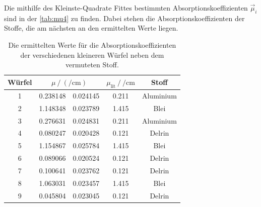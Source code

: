  \noindent Die mithilfe des Kleinste-Quadrate Fittes bestimmten Absorptionskoeffizienten $\vec{\mu}_i$ sind in der \autoref{tab:mu4} zu finden. 
  Dabei stehen die Absorptionskoeffizienten der Stoffe, die am nächsten an den ermittelten Werte liegen. 

  \begin{table}[H]
    \centering
    \caption{Die ermittelten Werte für die Absorptionskoeffizienten der verschiedenen kleineren Würfel neben dem vermuteten Stoff.}
    \label{tab:mu4}
    \begin{tabular}{c S[table-format=1.6] @{${}\pm{}$} S[table-format=1.6] S[table-format=1.6] c}
      \toprule
      {Würfel} &  & {$\mu_{\text{lit}} \mathbin{/} \si{\per\centi\metre}$} & {Stoff} \\
       & 0.238148 & 0.024145 & 0.211 & Aluminium \\
      2 & 1.148348 & 0.023789 & 1.415 & Blei \\
      3 & 0.276631 & 0.024831 & 0.211 & Aluminium \\
      4 & 0.080247 & 0.020428 & 0.121 & Delrin \\
      5 & 1.154867 & 0.025784 & 1.415 & Blei \\
      6 & 0.089066 & 0.020524 & 0.121 & Delrin \\
      7 & 0.100641 & 0.023762 & 0.121 & Delrin \\
      8 & 1.063031 & 0.023457 & 1.415 & Blei \\
      9 & 0.045804 & 0.023045 & 0.121 & Delrin \\
      \bottomrule
    \end{tabular}
  \end{table}

